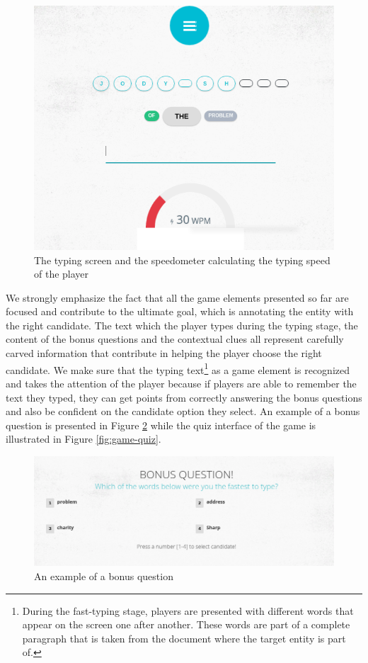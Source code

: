 \begin{figure}[]
  \centering
  \includegraphics[width=.6\linewidth]{figures/experiment2/gameplay1.png}
  \caption{The typing screen and the speedometer calculating the typing speed of the player}
  \label{fig:game-typingscreen}
\end{figure}

We strongly emphasize the fact that all the game elements presented so far are focused and contribute to the ultimate goal, which is annotating the entity with the right candidate. The text which the player types during the typing stage, the content of the bonus questions and the contextual clues all represent carefully carved information that contribute in helping the player choose the right candidate. We make sure that the typing text\footnote{During the fast-typing stage, players are presented with different words that appear on the screen one after another. These words are part of a complete paragraph that is taken from the document where the target entity is part of.} as a game element is recognized and takes the attention of the player because if players are able to remember the text they typed, they can get points from correctly answering the bonus questions and also be confident on the candidate option they select. An example of a bonus question is presented in Figure \ref{fig:game-bonusqeustion} while the quiz interface of the game is illustrated in Figure \ref{fig:game-quiz}. 

\begin{figure}[]
    \centering
    \includegraphics[width=.8\linewidth]{figures/experiment2/bonusquestion.png}
    \caption{An example of a bonus question}
    \label{fig:game-bonusqeustion}
\end{figure}

